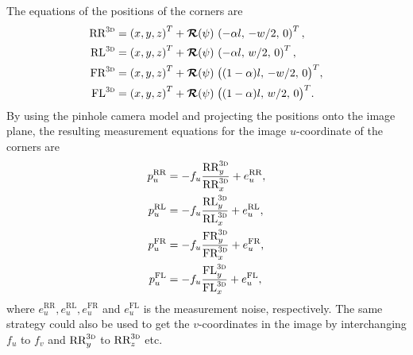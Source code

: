 The equations of the  positions of the corners are
%
\begin{align}
	\text{RR}^{\text{\textsc{{3}d}}} &=
	\left( x,  y, z \right)^T + \bm{\mathcal{R}}(\psi) \, \left( -\alpha l, \, -w/2, \, 0 \right)^T, \\
	\text{RL}^{\text{\textsc{{3}d}}} &=
	\left( x,  y, z \right)^T + \bm{\mathcal{R}}(\psi) \, \left( -\alpha l, \, w/2, \, 0 \right)^T, \\
	\text{FR}^{\text{\textsc{{3}d}}} &=
	\left( x,  y, z \right)^T + \bm{\mathcal{R}}(\psi) \; \big( (1-\alpha)l, \, -w/2, \, 0 \big)^T, \\
	\text{FL}^{\text{\textsc{{3}d}}} &=
	\left( x,  y, z \right)^T + \bm{\mathcal{R}}(\psi) \; \big( (1-\alpha)l, \, w/2, \, 0 \big)^T.
\end{align}
%
By using the pinhole camera model and projecting the  positions onto the image plane, the resulting measurement equations for the image $u$-coordinate of the corners are
%
\begin{align}
	p^\text{RR}_u &= -f_u \frac{\text{RR}_y^{\text{\textsc{{3}d}}}}{\text{RR}_x^{\text{\textsc{{3}d}}}} + e^\text{RR}_u, \\
	p^\text{RL}_u &= -f_u \frac{\text{RL}_y^{\text{\textsc{{3}d}}}}{\text{RL}_x^{\text{\textsc{{3}d}}}} + e^\text{RL}_u, \\
	p^\text{FR}_u &= -f_u \frac{\text{FR}_y^{\text{\textsc{{3}d}}}}{\text{FR}_x^{\text{\textsc{{3}d}}}} + e^\text{FR}_u, \\
	p^\text{FL}_u &= -f_u \frac{\text{FL}_y^{\text{\textsc{{3}d}}}}{\text{FL}_x^{\text{\textsc{{3}d}}}} + e^\text{FL}_u,
\end{align}
%
where $e^\text{RR}_u, e^\text{RL}_u, e^\text{FR}_u$ and $e^\text{FL}_u$ is the measurement noise, respectively.
The same strategy could also be used to get the $v$-coordinates in the image by interchanging $f_u$ to $f_v$ and $\text{RR}_y^\text{\textsc{{3}d}}$ to $\text{RR}_z^\text{\textsc{{3}d}}$ etc.

